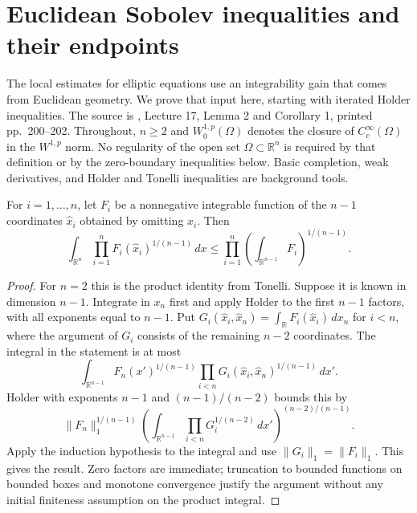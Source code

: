 \chapter{Euclidean Sobolev inequalities and their endpoints}\label{sec:sobolev-foundations}
The local estimates for elliptic equations use an integrability gain that comes from Euclidean geometry. We prove that input here, starting with iterated Holder inequalities. The source is \cite{SimonPDE}, Lecture 17, Lemma 2 and Corollary 1, printed pp.~200--202. Throughout, $n\geq2$ and $W^{1,p}_0(\Omega)$ denotes the closure of $C_c^\infty(\Omega)$ in the $W^{1,p}$ norm. No regularity of the open set $\Omega\subset\mathbb R^n$ is required by that definition or by the zero-boundary inequalities below. Basic completion, weak derivatives, and Holder and Tonelli inequalities are background tools.

\begin{lemma}\label{lem:coordinate-projection-holder}
For $i=1,\ldots,n$, let $F_i$ be a nonnegative integrable function of the $n-1$ coordinates $\widehat x_i$ obtained by omitting $x_i$. Then
\[
 \int_{\mathbb R^n}\prod_{i=1}^n F_i(\widehat x_i)^{1/(n-1)}\,dx
 \leq\prod_{i=1}^n\left(\int_{\mathbb R^{n-1}}F_i\right)^{1/(n-1)}.
\]
\end{lemma}
\begin{proof}
For $n=2$ this is the product identity from Tonelli. Suppose it is known in dimension $n-1$. Integrate in $x_n$ first and apply Holder to the first $n-1$ factors, with all exponents equal to $n-1$. Put $G_i(\widehat x_i,\widehat x_n)=\int_{\mathbb R}F_i(\widehat x_i)\,dx_n$ for $i<n$, where the argument of $G_i$ consists of the remaining $n-2$ coordinates. The integral in the statement is at most
\[
 \int_{\mathbb R^{n-1}}F_n(x')^{1/(n-1)}
             \prod_{i<n}G_i(\widehat x_i,\widehat x_n)^{1/(n-1)}\,dx'.
\]
Holder with exponents $n-1$ and $(n-1)/(n-2)$ bounds this by
\[
 \|F_n\|_1^{1/(n-1)}
 \left(\int_{\mathbb R^{n-1}}\prod_{i<n}G_i^{1/(n-2)}\,dx'\right)^{(n-2)/(n-1)}.
\]
Apply the induction hypothesis to the integral and use $\|G_i\|_1=\|F_i\|_1$. This gives the result. Zero factors are immediate; truncation to bounded functions on bounded boxes and monotone convergence justify the argument without any initial finiteness assumption on the product integral.
\end{proof}

